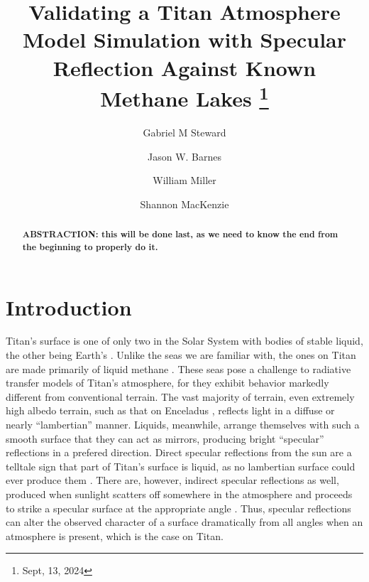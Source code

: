 \documentclass[twocolumn,linenumbers]{aastex631}
\begin{document}
\title{Validating a Titan Atmosphere Model Simulation with Specular Reflection Against Known Methane Lakes
\footnote{Sept, 13, 2024}}

\author[0000-0002-8482-4669]{Gabriel M Steward}

\author{Jason W. Barnes}

\author{William Miller}

\author{Shannon MacKenzie}

\begin{abstract}

\textbf{\color{red}ABSTRACTION: this will be done last, as we need to know the end from the beginning to properly do it.\color{black}}

\end{abstract}


\section{Introduction} \label{sec:intro}

Titan's surface is one of only two in the Solar System with bodies of stable liquid, the other being Earth's \citep{Hayes2016}. Unlike the seas we are familiar with, the ones on Titan are made primarily of liquid methane \citep{Mastrogiuseppe2016}. These seas pose a challenge to radiative transfer models of Titan's atmosphere, for they exhibit behavior markedly different from conventional terrain. The vast majority of terrain, even extremely high albedo terrain, such as that on Enceladus \citep{Li2023}, reflects light in a diffuse or nearly ``lambertian'' manner. Liquids, meanwhile, arrange themselves with such a smooth surface that they can act as mirrors, producing bright ``specular'' reflections in a prefered direction. Direct specular reflections from the sun are a telltale sign that part of Titan's surface is liquid, as no lambertian surface could ever produce them \citep{Stephan2010}. There are, however, indirect specular reflections as well, produced when sunlight scatters off somewhere in the atmosphere and proceeds to strike a specular surface at the appropriate angle \citep{Vixie2015}. Thus, specular reflections can alter the observed character of a surface dramatically from all angles when an atmosphere is present, which is the case on Titan.
\end{document}
